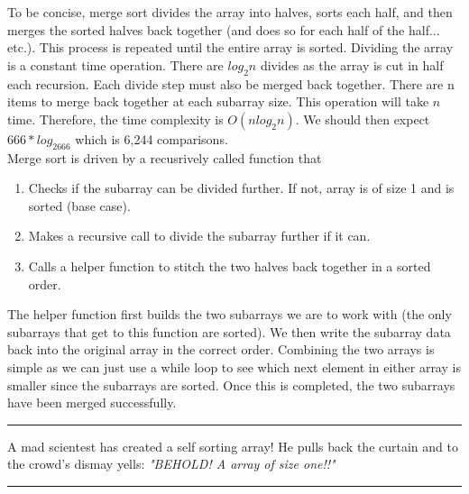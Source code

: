\documentclass[letterpaper, 10pt]{article}
\begin{document}
To be concise, merge sort divides the array into halves, sorts each half, and then merges the sorted halves back together (and does so for each half of the half... etc.). This process is repeated until the entire array is sorted.
Dividing the array is a constant time operation. There are \(log_2n \) divides as the array is cut in half each recursion. Each divide step must also be merged back together. There are n items to merge back together at each subarray size. This operation will take $n$ time. Therefore, the time complexity is $O(nlog_2n)$. We should then expect $666*log_2666$ which is 6,244 comparisons.\\
\newline
Merge sort is driven by a recusrively called function that
\begin{enumerate}
    \item Checks if the subarray can be divided further. If not, array is of size 1 and is sorted (base case).
    \item Makes a recursive call to divide the subarray further if it can.
    \item Calls a helper function to stitch the two halves back together in a sorted order.
\end{enumerate}

The helper function first builds the two subarrays we are to work with (the only subarrays that get to this function are sorted). We then write the subarray data back into the original array in the correct order. Combining the two arrays is simple as we can just use a while loop to see which next element in either array is smaller since the subarrays are sorted. Once this is completed, the two subarrays have been merged successfully.

\hrule
\vspace{.25cm}
A mad scientest has created a self sorting array! He pulls back the curtain and to the crowd's dismay yells: \textit{"BEHOLD! A array of size one!!"}
\vspace{.25cm}
\hrule
\end{document}
